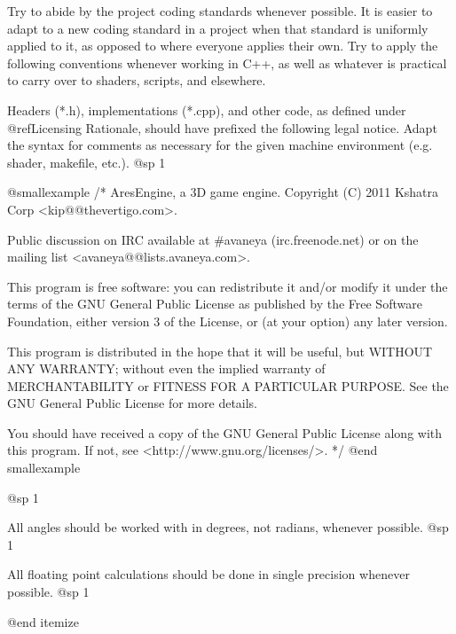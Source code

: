 

Try to abide by the project coding standards whenever possible. It is easier to adapt to a new coding standard in a project when that standard is uniformly applied to it, as opposed to where everyone applies their own. Try to apply the following conventions whenever working in C++, as well as whatever is practical to carry over to shaders, scripts, and elsewhere.

Headers (*.h), implementations (*.cpp), and other code, as defined under @ref{Licensing Rationale}, should have prefixed the following legal notice. Adapt the syntax for comments as necessary for the given machine environment (e.g. shader, makefile, etc.).
@sp 1

@smallexample
/*
    AresEngine, a 3D game engine.
    Copyright (C) 2011 Kshatra Corp <kip@@thevertigo.com>.

    Public discussion on IRC available at #avaneya (irc.freenode.net)
    or on the mailing list <avaneya@@lists.avaneya.com>.

    This program is free software: you can redistribute it and/or modify
    it under the terms of the GNU General Public License as published by
    the Free Software Foundation, either version 3 of the License, or
    (at your option) any later version.

    This program is distributed in the hope that it will be useful,
    but WITHOUT ANY WARRANTY; without even the implied warranty of
    MERCHANTABILITY or FITNESS FOR A PARTICULAR PURPOSE.  See the
    GNU General Public License for more details.

    You should have received a copy of the GNU General Public License
    along with this program.  If not, see <http://www.gnu.org/licenses/>.
*/
@end smallexample

@sp 1

\itemize
\item
All angles should be worked with in degrees, not radians, whenever possible.
@sp 1

\item
All floating point calculations should be done in single precision whenever possible.
@sp 1

@end itemize


